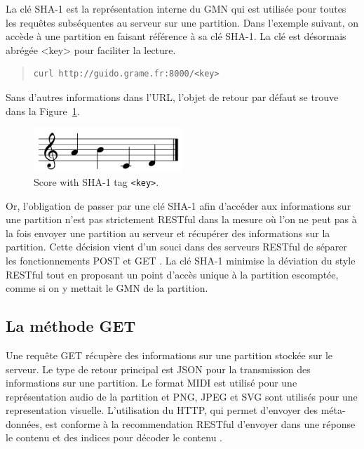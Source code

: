 \documentclass{article}
\newcommand{\guidosize}{7pt}
\begin{document}
La clé SHA-1 est la représentation interne du GMN qui est utilisée pour toutes les requêtes subséquentes au serveur sur une partition. Dans l'exemple suivant, on accède à une partition en faisant référence à sa clé SHA-1. La clé est désormais abrégée <key> pour faciliter la lecture.
\begin{quote}
\begingroup
\fontsize{\guidosize}{12pt}\selectfont
\begin{verbatim}
curl http://guido.grame.fr:8000/<key>
\end{verbatim}
\endgroup
\end{quote}
Sans d'autres informations dans l'URL, l'objet de retour par défaut se trouve dans la Figure~\ref{fig:figure1}.
\begin{figure}[h]
  \centering
    \includegraphics[width=0.5\textwidth]{figure1}
  \cprotect\caption{\label{fig:figure1}Score with SHA-1 tag \verb=<key>=.}
\end{figure}

Or, l'obligation de passer par une clé SHA-1 afin d'accéder aux informations sur une partition n'est pas strictement RESTful dans la mesure où l'on ne peut pas à la fois envoyer une partition au serveur et récupérer des informations sur la partition. Cette décision vient d'un souci dans des serveurs RESTful de séparer les fonctionnements POST et GET \cite{richardson2008restful}. La clé SHA-1 minimise la déviation du style RESTful tout en proposant un point d'accès unique à la partition escomptée, comme si on y mettait le GMN de la partition. %

\subsection{La méthode GET}\label{subsection:get}
Une requête GET récupère des informations sur une partition stockée sur le serveur. Le type de retour principal est JSON pour la transmission des informations sur une partition. Le format MIDI est utilisé pour une représentation audio de la partition et PNG, JPEG et SVG sont utilisés pour une representation visuelle. L'utilisation du HTTP, qui permet d'envoyer des méta-données, est conforme à la recommendation RESTful d'envoyer dans une réponse le contenu et des indices pour décoder le contenu \cite{richardson2008restful}.
\end{document}

